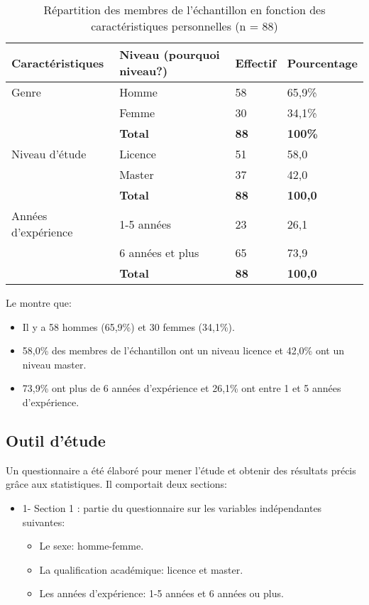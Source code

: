 \documentclass[french]{textolivre}
\begin{document}
\begin{table}[h!]
\centering
\begin{threeparttable}
\caption{Répartition des membres de l'échantillon en fonction des caractéristiques personnelles (n = 88) }
\label{tab1}
\begin{tabular}{llll}
\toprule
Caractéristiques & Niveau (pourquoi niveau?) & Effectif & Pourcentage \\
\midrule
Genre & Homme & 58 & 65,9\% \\
 & Femme & 30 & 34,1\% \\
 & \textbf{Total} & \textbf{88} & \textbf{100\%} \\
Niveau d’étude & Licence & 51 & 58,0 \\
 & Master & 37 & 42,0 \\
 & \textbf{Total} & \textbf{88} & \textbf{100,0} \\
Années d’expérience & 1-5 	années & 23 & 26,1 \\
 & 6 années et plus & 65 & 73,9 \\
 & \textbf{Total} & \textbf{88} & \textbf{100,0} \\
\bottomrule
\end{tabular}
\end{threeparttable}
\end{table}

Le  montre que:
\begin{itemize}
    \item Il y a 58 hommes (65,9\%) et 30 femmes (34,1\%).
    \item 58,0\% des membres de l’échantillon ont un niveau licence et 42,0\% ont un niveau master.
    \item 73,9\% ont plus de 6 années d’expérience et 26,1\% ont entre 1 et 5 années d'expérience.
\end{itemize}
 

\subsection{Outil d'étude}
Un questionnaire a été élaboré pour mener l'étude et obtenir des résultats précis grâce aux statistiques. Il comportait deux sections:

\begin{itemize}
    \item 1- Section 1 : partie du questionnaire sur les variables indépendantes suivantes:
    \begin{itemize}
        \item Le sexe: homme-femme.
        \item La qualification académique: licence et master. 
        \item Les années d'expérience: 1-5 années et 6 années ou plus.
    \end{itemize}
\end{itemize}
\end{document}
